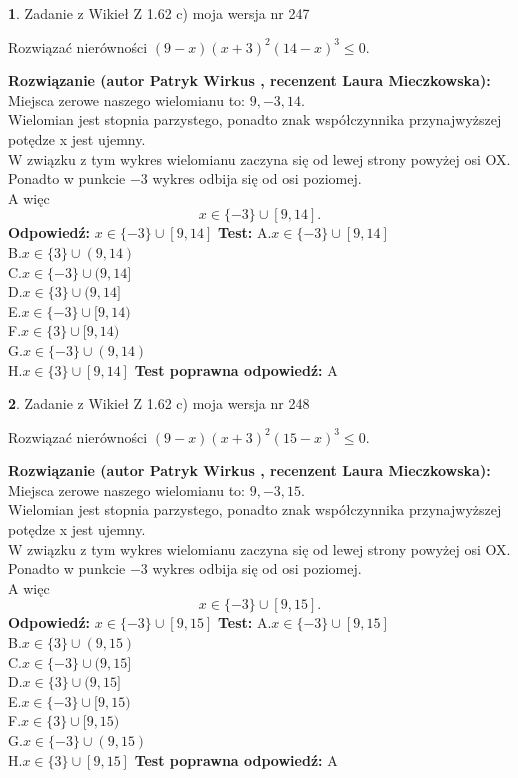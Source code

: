 \documentclass[12pt, a4paper]{article}
\theoremstyle{definition} %
\newtheorem{zad}{}
\newcommand{\zadStart}[1]{\begin{zad}#1\newline}
\newcommand{\zadStop}{\end{zad}}
\newcommand{\rozwStart}[2]{\noindent \textbf{Rozwiązanie (autor #1 , recenzent #2): }\newline}
\newcommand{\rozwStop}{\newline}
\newcommand{\odpStart}{\noindent \textbf{Odpowiedź:}\newline}
\newcommand{\odpStop}{\newline}
\newcommand{\testStart}{\noindent \textbf{Test:}\newline}
\newcommand{\testStop}{\newline}
\newcommand{\kluczStart}{\noindent \textbf{Test poprawna odpowiedź:}\newline}
\newcommand{\kluczStop}{\newline}
\begin{document}
\zadStart{Zadanie z Wikieł Z 1.62 c) moja wersja nr 247}

Rozwiązać nierówności $(9-x)(x+3)^{2}(14-x)^{3}\le0$.
\zadStop
\rozwStart{Patryk Wirkus}{Laura Mieczkowska}
Miejsca zerowe naszego wielomianu to: $9, -3, 14$.\\
Wielomian jest stopnia parzystego, ponadto znak współczynnika przy\linebreak najwyższej potędze x jest ujemny.\\ W związku z tym wykres wielomianu zaczyna się od lewej strony powyżej osi OX.\\
Ponadto w punkcie $-3$ wykres odbija się od osi poziomej.\\
A więc $$x \in \{-3\} \cup [9,14].$$
\rozwStop
\odpStart
$x \in \{-3\} \cup [9,14]$
\odpStop
\testStart
A.$x \in \{-3\} \cup [9,14]$\\
B.$x \in \{3\} \cup (9,14)$\\
C.$x \in \{-3\} \cup (9,14]$\\
D.$x \in \{3\} \cup (9,14]$\\
E.$x \in \{-3\} \cup [9,14)$\\
F.$x \in \{3\} \cup [9,14)$\\
G.$x \in \{-3\} \cup (9,14)$\\
H.$x \in \{3\} \cup [9,14]$
\testStop
\kluczStart
A
\kluczStop



\zadStart{Zadanie z Wikieł Z 1.62 c) moja wersja nr 248}

Rozwiązać nierówności $(9-x)(x+3)^{2}(15-x)^{3}\le0$.
\zadStop
\rozwStart{Patryk Wirkus}{Laura Mieczkowska}
Miejsca zerowe naszego wielomianu to: $9, -3, 15$.\\
Wielomian jest stopnia parzystego, ponadto znak współczynnika przy\linebreak najwyższej potędze x jest ujemny.\\ W związku z tym wykres wielomianu zaczyna się od lewej strony powyżej osi OX.\\
Ponadto w punkcie $-3$ wykres odbija się od osi poziomej.\\
A więc $$x \in \{-3\} \cup [9,15].$$
\rozwStop
\odpStart
$x \in \{-3\} \cup [9,15]$
\odpStop
\testStart
A.$x \in \{-3\} \cup [9,15]$\\
B.$x \in \{3\} \cup (9,15)$\\
C.$x \in \{-3\} \cup (9,15]$\\
D.$x \in \{3\} \cup (9,15]$\\
E.$x \in \{-3\} \cup [9,15)$\\
F.$x \in \{3\} \cup [9,15)$\\
G.$x \in \{-3\} \cup (9,15)$\\
H.$x \in \{3\} \cup [9,15]$
\testStop
\kluczStart
A
\kluczStop
\end{document}
